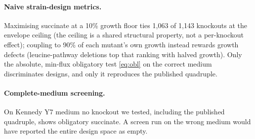 \documentclass[12pt]{article}
\begin{document}
\paragraph{Naive strain-design metrics.} Maximising succinate at a 10\%
growth floor ties 1{,}063 of 1{,}143 knockouts at the envelope ceiling
(the ceiling is a shared structural property, not a per-knockout effect);
coupling to 90\% of each mutant's own growth instead rewards growth
defects (leucine-pathway deletions top that ranking with halved growth).
Only the absolute, min-flux obligatory test \eqref{eq:obl} on the correct
medium discriminates designs, and only it reproduces the published
quadruple.
\paragraph{Complete-medium screening.} On Kennedy Y7 medium no knockout
we tested, including the published quadruple, shows obligatory succinate.
A screen run on the wrong medium would have reported the entire design
space as empty.
\end{document}
